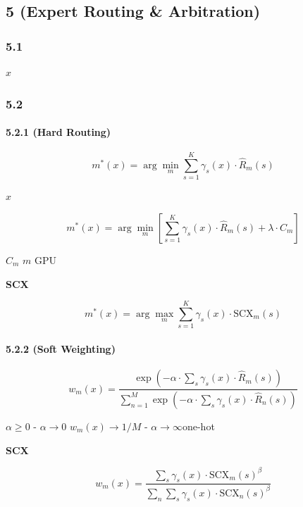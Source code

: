 \documentclass[
  12pt,
]{article}
\begin{document}
\subsection{ 5 (Expert Routing \&
Arbitration)}\label{ux6a21ux5757-5ux4e13ux5bb6ux8defux7531ux4e0eux4ef2ux88c1-expert-routing-arbitration}

\subsubsection{5.1 }\label{ux95eeux9898ux8bbeux5b9a-4}


\(x\)\textbf{}


\subsubsection{5.2 }\label{ux6570ux5b66ux6a21ux578b-4}

\paragraph{5.2.1  (Hard
Routing)}\label{ux786cux8defux7531-hard-routing}

\textbf{}

\[
m^*(x) = \arg\min_m \sum_{s=1}^K \gamma_s(x) \cdot \hat{R}_m(s)
\]

 \(x\) 

\textbf{}

\[
m^*(x) = \arg\min_m \left[\sum_{s=1}^K \gamma_s(x) \cdot \hat{R}_m(s) + \lambda \cdot C_m\right]
\]

 \(C_m\)  \(m\) GPU 

\textbf{ SCX }

\[
m^*(x) = \arg\max_m \sum_{s=1}^K \gamma_s(x) \cdot \text{SCX}_m(s)
\]



\paragraph{5.2.2  (Soft
Weighting)}\label{ux8f6fux52a0ux6743-soft-weighting}

\textbf{}

\[
w_m(x) = \frac{\exp\left(-\alpha \cdot \sum_s \gamma_s(x) \cdot \hat{R}_m(s)\right)}{\sum_{n=1}^M \exp\left(-\alpha \cdot \sum_s \gamma_s(x) \cdot \hat{R}_n(s)\right)}
\]

 \(\alpha \geq 0\)  - \(\alpha \to 0\)
\(w_m(x) \to 1/M\) - \(\alpha \to \infty\)one-hot 

\textbf{ SCX }

\[
w_m(x) = \frac{\sum_s \gamma_s(x) \cdot \text{SCX}_m(s)^\beta}{\sum_n \sum_s \gamma_s(x) \cdot \text{SCX}_n(s)^\beta}
\]
\end{document}
